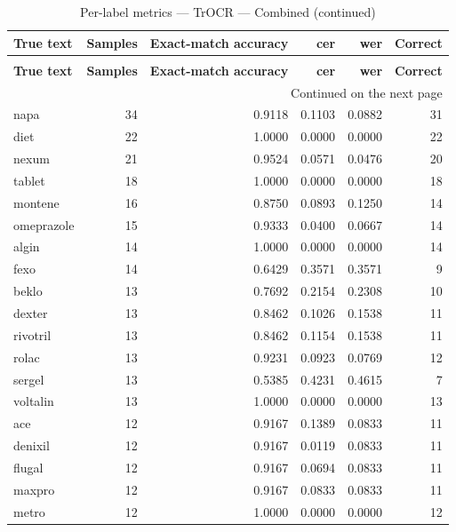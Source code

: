 \begingroup
\setlength{\tabcolsep}{2.5pt}
\renewcommand{\arraystretch}{1.05}
\sloppy
\scriptsize
\begin{longtable}{p{3.0cm}rrrrr}
\caption{Per-label metrics — TrOCR — Combined}\label{tab:e3-03_trocr_evaluation-per-label}\\
\toprule
\textbf{True text} & \textbf{Samples} & \textbf{Exact-match accuracy} & \textbf{cer} & \textbf{wer} & \textbf{Correct} \\
\midrule
\endfirsthead
\caption*{Per-label metrics — TrOCR — Combined (continued)}\\
\toprule
\textbf{True text} & \textbf{Samples} & \textbf{Exact-match accuracy} & \textbf{cer} & \textbf{wer} & \textbf{Correct} \\
\midrule
\endhead
\midrule
\multicolumn{6}{r}{Continued on the next page}\\
\endfoot
\bottomrule
\endlastfoot
napa & 34 & 0.9118 & 0.1103 & 0.0882 & 31 \\
diet & 22 & 1.0000 & 0.0000 & 0.0000 & 22 \\
nexum & 21 & 0.9524 & 0.0571 & 0.0476 & 20 \\
tablet & 18 & 1.0000 & 0.0000 & 0.0000 & 18 \\
montene & 16 & 0.8750 & 0.0893 & 0.1250 & 14 \\
omeprazole & 15 & 0.9333 & 0.0400 & 0.0667 & 14 \\
algin & 14 & 1.0000 & 0.0000 & 0.0000 & 14 \\
fexo & 14 & 0.6429 & 0.3571 & 0.3571 & 9 \\
beklo & 13 & 0.7692 & 0.2154 & 0.2308 & 10 \\
dexter & 13 & 0.8462 & 0.1026 & 0.1538 & 11 \\
rivotril & 13 & 0.8462 & 0.1154 & 0.1538 & 11 \\
rolac & 13 & 0.9231 & 0.0923 & 0.0769 & 12 \\
sergel & 13 & 0.5385 & 0.4231 & 0.4615 & 7 \\
voltalin & 13 & 1.0000 & 0.0000 & 0.0000 & 13 \\
ace & 12 & 0.9167 & 0.1389 & 0.0833 & 11 \\
denixil & 12 & 0.9167 & 0.0119 & 0.0833 & 11 \\
flugal & 12 & 0.9167 & 0.0694 & 0.0833 & 11 \\
maxpro & 12 & 0.9167 & 0.0833 & 0.0833 & 11 \\
metro & 12 & 1.0000 & 0.0000 & 0.0000 & 12 \\

\end{longtable}
